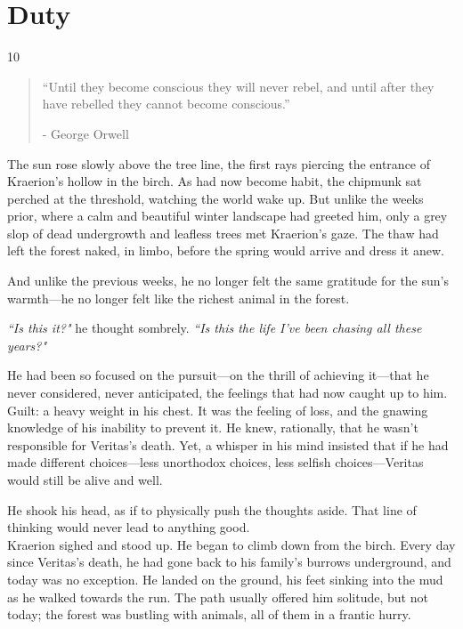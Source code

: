 \chapter{Duty}

\vspace{-1.3cm}
\begin{localsize}{10}
    \begin{quote}
        “Until they become conscious they will never rebel, and until after they have rebelled they cannot become conscious.”
        \begin{flushright}- George Orwell \end{flushright}
    \end{quote}
\end{localsize}
\vspace{1cm}


The sun rose slowly above the tree line, the first rays piercing the entrance of Kraerion's hollow in the birch.
As had now become habit, the chipmunk sat perched at the threshold, watching the world wake up.
But unlike the weeks prior, where a calm and beautiful winter landscape had greeted him, only a grey slop of dead undergrowth and leafless trees met Kraerion's gaze.
The thaw had left the forest naked, in limbo, before the spring would arrive and dress it anew.

And unlike the previous weeks, he no longer felt the same gratitude for the sun's warmth---he no longer felt like the richest animal in the forest.

\textit{``Is this it?"} he thought sombrely. \textit{``Is this the life I've been chasing all these years?"}

He had been so focused on the pursuit---on the thrill of achieving it---that he never considered, never anticipated, the feelings that had now caught up to him.
Guilt: a heavy weight in his chest.
It was the feeling of loss, and the gnawing knowledge of his inability to prevent it.
He knew, rationally, that he wasn't responsible for Veritas's death.
Yet, a whisper in his mind insisted that if he had made different choices---less unorthodox choices, less selfish choices---Veritas would still be alive and well.

He shook his head, as if to physically push the thoughts aside.
That line of thinking would never lead to anything good.\\

Kraerion sighed and stood up.
He began to climb down from the birch.
Every day since Veritas's death, he had gone back to his family's burrows underground, and today was no exception.
He landed on the ground, his feet sinking into the mud as he walked towards the run.
The path usually offered him solitude, but not today; the forest was bustling with animals, all of them in a frantic hurry.

